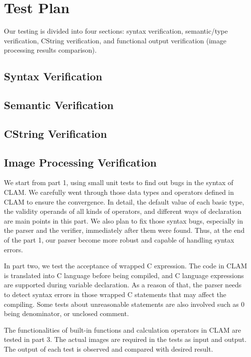 \chapter{Test Plan}
\label{chap:testplan}

Our testing is divided into four sections: syntax verification, semantic/type verification, CString verification, and functional output verification (image processing results comparison). 

\section{Syntax Verification}
\label{testing:syntax}

\section{Semantic Verification}
\label{testing:semantic}

\section{CString Verification}
\label{testing:cstrings}

\section{Image Processing Verification}
\label{test:output}


We start from part 1, using small unit tests to find out bugs in the syntax of CLAM. We carefully went through those data types and operators defined in CLAM to ensure the convergence. In detail, the default value of each basic type, the validity operands of all kinds of operators, and different ways of declaration are main points in this part. We also plan to fix those syntax bugs, especially in the parser and the verifier, immediately after them were found. Thus, at the end of the part 1, our  parser become more robust and capable of handling syntax errors.

In part two, we test the acceptance of wrapped C expression. The code in CLAM is translated into C language before being compiled, and C language expressions are supported during variable declaration. As a reason of that,  the parser needs to detect syntax errors in those wrapped C statements that may affect the compiling. Some tests about unreasonable statements are also involved such as 0 being denominator, or unclosed comment.

The functionalities of built-in functions and calculation operators in CLAM are tested in part 3. The actual images are required in the tests as input and output. The output of each test is observed and compared with desired result.

